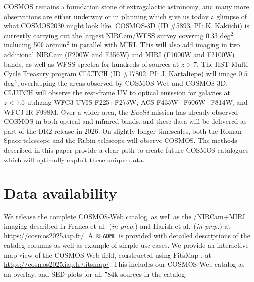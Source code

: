 \documentclass[longauth]{aa}
\begin{document}
COSMOS remains a foundation stone of extragalactic astronomy, and many more observations are either underway or in planning which give us today a glimpse of what COSMOS2030 might look like. COSMOS-3D (ID \#5893, PI: K. Kakiichi) is currently carrying out the largest NIRCam/WFSS survey covering $0.33$ deg$^2$, including 500 arcmin$^2$ in parallel with MIRI. This will also add imaging in two additional NIRCam (F200W and F356W) and MIRI (F1000W and F2100W) bands, as well as WFSS spectra for hundreds of sources at $z>7$. The HST Multi-Cycle Treasury program CLUTCH (ID \#17802, PI: J. Kartaltepe) will image $0.5$ deg$^2$, overlapping the areas observed by COSMOS-Web and COSMOS-3D. CLUTCH will observe the rest-frame UV to optical emission for galaxies at $z<7.5$ utilizing WFC3-UVIS F225+F275W, ACS F435W+F606W+F814W, and WFC3-IR F098M. Over a wider area, the \textit{Euclid} mission has already observed COSMOS in both optical and infrared bands, and these data will be delivered as part of the DR2 release in 2026. On slightly longer timescales, both the Roman Space telescope and the Rubin telescope will observe COSMOS.  The methods described in this paper provide a clear path to create future COSMOS catalogues which will optimally exploit these unique data. 

\section*{Data availability} \label{sec:data-availability}

We release the complete COSMOS-Web catalog, as well as the \JWST/NIRCam+MIRI imaging described in Franco et al.~(\textit{in prep.}) and Harish et al.~(\textit{in prep.}) at \url{https://cosmos2025.iap.fr/}. A \texttt{README} is provided with detailed descriptions of the catalog columns as well as example of simple use cases.
We provide an interactive map view of the COSMOS-Web field, constructed using FitsMap \citep{Hausen2022}, at \url{https://cosmos2025.iap.fr/fitsmap/}. This includes our COSMOS-Web catalog as an overlay, and SED plots for all 784k sources in the catalog. 
\end{document}
